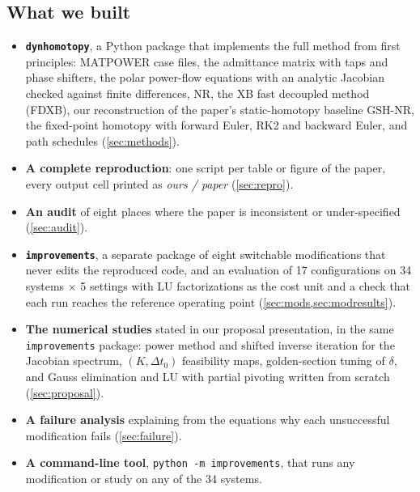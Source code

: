 \documentclass[11pt,a4paper]{article}
\newcommand{\code}[1]{\texttt{#1}}
\begin{document}
\subsection{What we built}
\begin{itemize}
  \item \textbf{\code{dynhomotopy}}, a Python package that implements the full method from first
        principles: MATPOWER case files, the admittance matrix with taps and phase shifters, the polar
        power-flow equations with an analytic Jacobian checked against finite differences, NR, the XB
        fast decoupled method (FDXB), our reconstruction of the paper's static-homotopy baseline GSH-NR,
        the fixed-point homotopy with forward Euler, RK2 and backward Euler, and path schedules
        (\cref{sec:methods}).
  \item \textbf{A complete reproduction}: one script per table or figure of the paper, every output cell
        printed as \emph{ours / paper} (\cref{sec:repro}).
  \item \textbf{An audit} of eight places where the paper is inconsistent or under-specified
        (\cref{sec:audit}).
  \item \textbf{\code{improvements}}, a separate package of eight switchable modifications that never
        edits the reproduced code, and an evaluation of 17 configurations on 34 systems $\times$ 5
        settings with LU factorizations as the cost unit and a check that each run reaches the reference
        operating point (\cref{sec:mods,sec:modresults}).
  \item \textbf{The numerical studies} stated in our proposal presentation, in the same \code{improvements} package: power method and
        shifted inverse iteration for the Jacobian spectrum, $(K,\Delta t_0)$ feasibility maps,
        golden-section tuning of $\delta$, and Gauss elimination and LU with partial pivoting written from
        scratch (\cref{sec:proposal}).
  \item \textbf{A failure analysis} explaining from the equations why each unsuccessful modification
        fails (\cref{sec:failure}).
  \item \textbf{A command-line tool}, \code{python -m improvements}, that runs any modification or study
        on any of the 34 systems.
\end{itemize}
\end{document}
